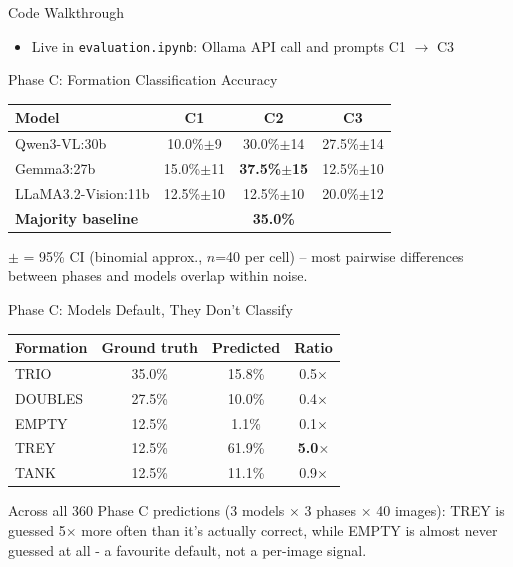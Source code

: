 \documentclass[9pt,aspectratio=169]{beamer}
\begin{document}
\begin{frame}[fragile]{Code Walkthrough}
  \small
  \begin{itemize}
    \item Live in \texttt{evaluation.ipynb}: Ollama API call and prompts C1 $\rightarrow$ C3
  \end{itemize}
\end{frame}

\begin{frame}{Phase C: Formation Classification Accuracy}
  \centering
  \renewcommand{\arraystretch}{1.3}
  \footnotesize
  \begin{tabular}{lccc}
    \toprule
    \textbf{Model} & \textbf{C1} & \textbf{C2} & \textbf{C3}  \\
    \midrule
    Qwen3-VL:30b        & 10.0\%$\pm$9  & 30.0\%$\pm$14 & 27.5\%$\pm$14 \\
    Gemma3:27b          & 15.0\%$\pm$11 & \textbf{37.5\%$\pm$15} & 12.5\%$\pm$10  \\
    LLaMA3.2-Vision:11b & 12.5\%$\pm$10 & 12.5\%$\pm$10 & 20.0\%$\pm$12 \\
    \midrule
    \textbf{Majority baseline} & \multicolumn{3}{c}{\textbf{35.0\%}} \\
    \bottomrule
  \end{tabular}
  \vfill
  \small $\pm$ = 95\% CI (binomial approx., $n$=40 per cell) -- most pairwise differences between phases and models overlap within noise.
\end{frame}

\begin{frame}{Phase C: Models Default, They Don't Classify}
  \centering
  \renewcommand{\arraystretch}{1.3}
  \footnotesize
\begin{tabular}{lccc}
	\toprule
	\textbf{Formation} & \textbf{Ground truth} & \textbf{Predicted} & \textbf{Ratio} \\
	\midrule
	TRIO    & 35.0\% & 15.8\% & 0.5$\times$ \\
	DOUBLES & 27.5\% & 10.0\% & 0.4$\times$ \\
	EMPTY   & 12.5\% &  1.1\% & 0.1$\times$ \\
	TREY    & 12.5\% & 61.9\% & \textbf{5.0$\times$} \\
	TANK    & 12.5\% & 11.1\% & 0.9$\times$ \\
	\bottomrule
\end{tabular}	
  \vfill
  \small Across all 360 Phase C predictions (3 models $\times$ 3 phases $\times$ 40 images): TREY is guessed 5$\times$ more often than it's actually correct, while EMPTY is almost never guessed at all - a favourite default, not a per-image signal.
\end{frame}
\end{document}
